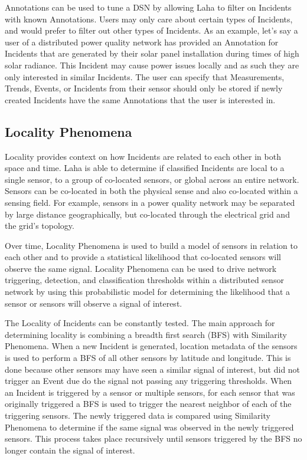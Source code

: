 Annotations can be used to tune a DSN by allowing Laha to filter on Incidents with known Annotations. Users may only care about certain types of Incidents, and would prefer to filter out other types of Incidents. As an example, let's say a user of a distributed power quality network has provided an Annotation for Incidents that are generated by their solar panel installation during times of high solar radiance. This Incident may cause power issues locally and as such they are only interested in similar Incidents. The user can specify that Measurements, Trends, Events, or Incidents from their sensor should only be stored if newly created Incidents have the same Annotations that the user is interested in.

\subsection{Locality Phenomena}\label{subsec:locality-phenomena}
Locality provides context on how Incidents are related to each other in both space and time. Laha is able to determine if classified Incidents are local to a single sensor, to a group of co-located sensors, or global across an entire network. Sensors can be co-located in both the physical sense and also co-located within a sensing field. For example, sensors in a power quality network may be separated by large distance geographically, but co-located through the electrical grid and the grid's topology.

Over time, Locality Phenomena is used to build a model of sensors in relation to each other and to provide a statistical likelihood that co-located sensors will observe the same signal. Locality Phenomena can be used to drive network triggering, detection, and classification thresholds within a distributed sensor network by using this probabilistic model for determining the likelihood that a sensor or sensors will observe a signal of interest.

The Locality of Incidents can be constantly tested. The main approach for determining locality is combining a breadth first search (BFS) with Similarity Phenomena. When a new Incident is generated, location metadata of the sensors is used to perform a BFS of all other sensors by latitude and longitude. This is done because other sensors may have seen a similar signal of interest, but did not trigger an Event due do the signal not passing any triggering thresholds. When an Incident is triggered by a sensor or multiple sensors, for each sensor that was originally triggered a BFS is used to trigger the nearest neighbor of each of the triggering sensors. The newly triggered data is compared using Similarity Phenomena to determine if the same signal was observed in the newly triggered sensors. This process takes place recursively until sensors triggered by the BFS no longer contain the signal of interest.

